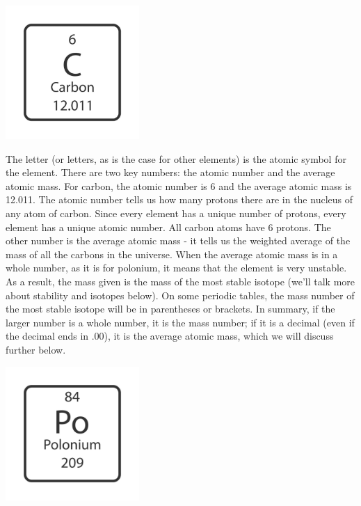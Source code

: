 \begin{center}
\includegraphics[width=2in]{carbon_tile.png}
\end{center}

The letter (or letters, as is the case for other elements) is the atomic symbol
for the element. There are two key numbers: the atomic number and the average 
atomic mass. For carbon, the atomic number is 6 and the average atomic mass is 
12.011. The atomic number tells us how many protons there are in the nucleus of
any atom of carbon. Since every element has a unique number of protons, every 
element has a unique atomic number. All carbon atoms have 6 protons. The other 
number is the average atomic mass - it tells us the weighted average of the 
mass of all the carbons in the universe. When the average atomic mass is in 
a whole number, as it is for polonium, it means that the element is very unstable.
As a result, the mass given is the mass of the most stable isotope (we'll talk 
more about stability and isotopes below). On some periodic tables, the mass 
number of the most stable isotope will be in parentheses or brackets. In 
summary, if the larger number is a whole number, it is the mass number; if it 
is a decimal (even if the decimal ends in .00), it is the average atomic mass, 
which we will discuss further below. 

\begin{center}
\includegraphics[width=2in]{polonium_tile.png}
\end{center}

